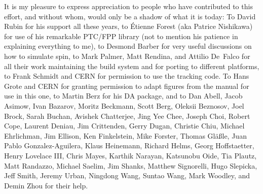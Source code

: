 It is my pleasure to express appreciation to people who have contributed to this effort, and without
whom, \bmad would only be a shadow of what it is today: To David Rubin for his support all these
years, to \'Etienne Forest (aka Patrice Nishikawa) for use of his remarkable PTC/FPP library (not to
mention his patience in explaining everything to me), to Desmond Barber for very useful discussions
on how to simulate spin, to Mark Palmer, Matt Rendina, and Attilio De~Falco for all their work
maintaining the build system and for porting \bmad to different platforms, to Frank Schmidt and CERN
for permission to use the \mad tracking code. To Hans Grote and CERN for granting permission to
adapt figures from the \mad manual for use in this one, to Martin Berz for his DA package, and to
Dan Abell, Jacob Asimow, Ivan Bazarov, Moritz Beckmann, Scott Berg, Oleksii Beznosov, Joel Brock,
Sarah Buchan, Avishek Chatterjee, Jing Yee Chee, Joseph Choi, Robert Cope, Laurent Deniau, Jim
Crittenden, Gerry Dugan, Christie Chiu, Michael Ehrlichman, Jim Ellison, Ken Finkelstein, Mike
Forster, Thomas Gl{\"a}{\ss}le, Juan Pablo Gonzalez-Aguilera, Klaus Heinemann, Richard Helms, Georg
Hoffstaetter, Henry Lovelace III, Chris Mayes, Karthik Narayan, Katsunobu Oide, Tia Plautz, Matt
Randazzo, Michael Saelim, Jim Shanks, Matthew Signorelli, Hugo Slepicka, Jeff Smith, Jeremy Urban,
Ningdong Wang, Suntao Wang, Mark Woodley, and Demin Zhou for their help.

